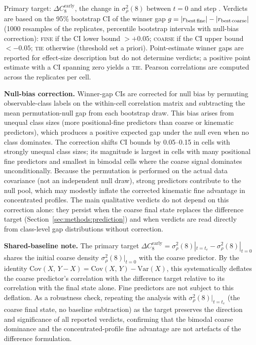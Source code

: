 \documentclass[twocolumn,linenumbers]{aastex701}
\newcommand{\dCearly}{\Delta C_{8}^{\mathrm{early}}}
\newcommand{\sigrho}{\sigma^{2}_{\rho}}
\begin{document}
Primary target: $\dCearly$, the change in $\sigrho(8)$ between $t=0$ and
step \HEarly{}.
Verdicts are based on the 95\% bootstrap CI of the winner gap
$g = |r_{\rm best\,fine}| - |r_{\rm best\,coarse}|$
(1000 resamples of the \NReplicates{} replicates, percentile bootstrap
intervals with null-bias correction):
\textsc{fine} if the CI lower bound $> +0.05$;
\textsc{coarse} if the CI upper bound $< -0.05$;
\textsc{tie} otherwise (threshold set a priori).
Point-estimate winner gaps are reported for effect-size description but do not
determine verdicts; a positive point estimate with a CI spanning zero yields
a \textsc{tie}.
Pearson correlations are computed across the \NReplicates{} replicates per cell.

\textbf{Null-bias correction.}
Winner-gap CIs are corrected for null bias by permuting observable-class
labels on the within-cell correlation matrix and subtracting the mean
permutation-null gap from each bootstrap draw.
This bias arises from unequal class sizes (more positional-fine predictors
than coarse or kinematic predictors), which produces a positive expected
gap under the null even when no class dominates.
The correction shifts CI bounds by 0.05--0.15 in cells with strongly
unequal class sizes; its magnitude is largest in cells with many
positional fine predictors and smallest in bimodal cells where the
coarse signal dominates unconditionally.
Because the permutation is performed on the actual data covariance
(not an independent null draw), strong predictors contribute to the
null pool, which may modestly inflate the corrected kinematic fine
advantage in concentrated profiles.
The main qualitative verdicts do not depend on this correction alone:
they persist when the coarse final state replaces the difference target
(Section~\ref{sec:methods:prediction}) and when verdicts are read
directly from class-level gap distributions without correction.

\textbf{Shared-baseline note.}
The primary target $\dCearly = \sigrho(8)|_{t=t_e} - \sigrho(8)|_{t=0}$
shares the initial coarse density $\sigrho(8)|_{t=0}$ with the coarse
predictor.  By the identity
$\mathrm{Cov}(X,\,Y - X) = \mathrm{Cov}(X,\,Y) - \mathrm{Var}(X)$,
this systematically deflates the coarse predictor's correlation with the
difference target relative to its correlation with the final state alone.
Fine predictors are not subject to this deflation.
As a robustness check, repeating the analysis with $\sigrho(8)|_{t=t_e}$
(the coarse final state, no baseline subtraction) as the target preserves
the direction and significance of all reported verdicts, confirming that
the bimodal coarse dominance and the concentrated-profile fine advantage
are not artefacts of the difference formulation.
\end{document}
